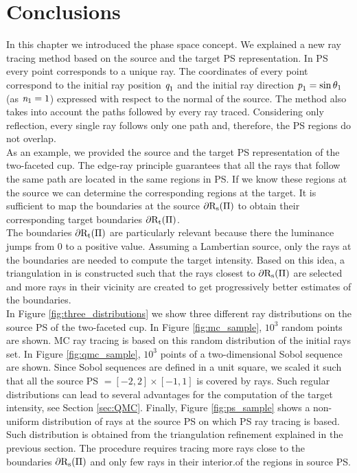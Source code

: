 \section{Conclusions}
In this chapter we introduced the phase space concept. 
We explained a new ray tracing method based on the source and the target PS representation. 
In PS every point corresponds to a unique ray. 
The coordinates of every point correspond to the initial ray position $\textit{q}_1$ and the initial ray direction $\textit{p}_1 = \sin\theta_1$ (as $\textit{n}_1 = 1$) expressed with respect to the normal of the source. The method also takes into account the paths followed by every ray traced.
Considering only reflection, every single ray follows only one path and, therefore, the PS regions do not overlap. 
\\ \indent
As an example, we provided the source and the target PS representation of the two-faceted cup.
The edge-ray principle guarantees that all the rays that follow the same path are located in the same regions in PS. If we know these regions at the source we can determine the corresponding regions at the target. 
It is sufficient to map the boundaries at the source $\partial\mbox{$\textup{R}$}_\textrm{s}(\Pi)$ to obtain their corresponding target boundaries $\partial\mbox{$\textup{R}$}_\textrm{t}(\Pi)$. \\ \indent
The boundaries $\partial\mbox{$\textup{R}$}_\textrm{t}(\Pi)$ are particularly relevant because there the luminance jumps from $0$ to a positive value. 
Assuming a Lambertian source, only the rays at the boundaries are needed to compute the target intensity. 
Based on this idea, a triangulation in  is constructed such that the rays closest to $\partial\mbox{$\textup{R}$}_\textrm{s}(\Pi)$
are selected and more rays in their vicinity are created to get progressively better estimates of the boundaries.
\\ \indent In Figure \ref{fig:three_distributions} we show three different ray distributions on the source PS of the two-faceted cup. In Figure \ref{fig:mc_sample}, $10^3$ random points are shown. MC ray tracing is based on this random distribution of the initial rays set. In Figure \ref{fig:qmc_sample}, $10^3$ points of a two-dimensional Sobol sequence are shown. 
Since Sobol sequences are defined in a unit square, we scaled it such that all the source PS $=[-2, 2]\times[-1, 1]$ is covered by rays. Such regular distributions can lead to several advantages for the computation of the target intensity, see Section \ref{sec:QMC}. Finally, Figure \ref{fig:ps_sample} shows a non-uniform distribution of rays at the source PS on which PS ray tracing is based. Such distribution is obtained from the triangulation refinement explained in the previous section. The procedure requires tracing more rays close to the boundaries $\partial\mbox{$\textup{R}$}_\textrm{s}(\Pi)$ and only few rays in their interior.of the regions in source PS. 
